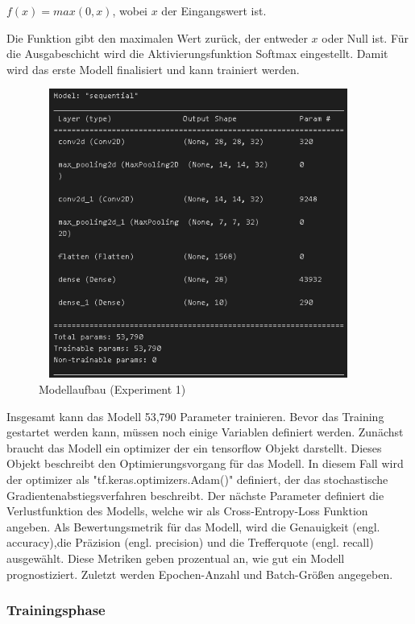 \documentclass[12pt]{scrreprt}
\begin{document}
\begin{center}
	$f(x) = max(0,x)$, wobei $x$ der Eingangswert ist.
\end{center}

Die Funktion gibt den maximalen Wert zurück, der entweder $x$ oder Null ist. Für die Ausgabeschicht wird die Aktivierungsfunktion Softmax eingestellt. Damit wird das erste Modell finalisiert und kann trainiert werden.
	
\begin{figure}[h!]
	\centering
	\includegraphics[width=10.5cm, height=9.5cm]		{ExperimentModelAufbau_1.png}
	\caption{  Modellaufbau \cite{HK22} (Experiment 1)}
	\label{fig:fig13}
\end{figure}
	
Insgesamt kann das Modell 53,790 Parameter trainieren. Bevor das Training gestartet werden kann, müssen noch einige Variablen definiert werden. Zunächst braucht das Modell ein optimizer der ein tensorflow Objekt darstellt. Dieses Objekt beschreibt den Optimierungsvorgang für das Modell. In diesem Fall wird der optimizer als "tf.keras.optimizers.Adam()" definiert, der das stochastische Gradientenabstiegsverfahren beschreibt. Der nächste Parameter definiert die Verlustfunktion des Modells, welche wir als Cross-Entropy-Loss Funktion angeben. Als Bewertungsmetrik für das Modell, wird die Genauigkeit (engl. accuracy),die Präzision (engl. precision) und die Trefferquote (engl. recall) ausgewählt. Diese Metriken geben prozentual an, wie gut ein Modell prognostiziert. Zuletzt werden Epochen-Anzahl und Batch-Größen angegeben. 
	
\subsubsection{Trainingsphase}
	
\end{document}

